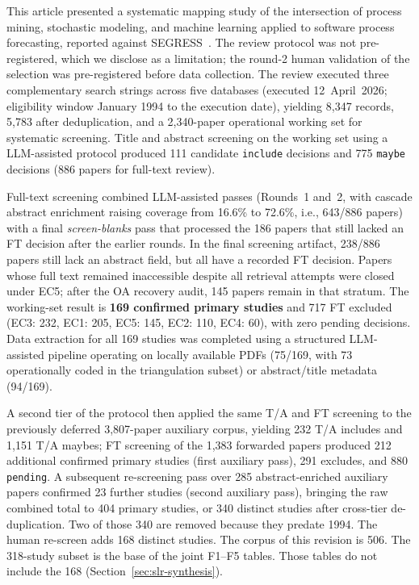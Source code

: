 This article presented a systematic mapping study of the intersection of
process mining, stochastic modeling, and machine learning applied to software
process forecasting, reported against SEGRESS~\cite{kitchenham2023segress}.
The review protocol was not pre-registered, which we disclose as a
limitation; the round-2 human validation of the selection was pre-registered
before data collection.
The review executed three complementary search strings across five databases
(executed 12~April~2026; eligibility window January 1994 to the execution
date), yielding 8{,}347
records, 5{,}783 after deduplication, and a 2{,}340-paper operational working
set for systematic screening. Title
and abstract screening on the working set using a LLM-assisted protocol
produced 111 candidate \texttt{include} decisions and 775 \texttt{maybe}
decisions (886 papers for full-text review).

Full-text screening combined LLM-assisted passes (Rounds~1 and~2, with cascade
abstract enrichment raising coverage from 16.6\% to 72.6\%, i.e., 643/886
papers) with a final \emph{screen-blanks} pass that processed the 186 papers
that still lacked an FT decision after the earlier rounds. In the final
screening artifact, 238/886 papers still lack an abstract field, but all have
a recorded FT decision. Papers whose full text remained inaccessible despite
all retrieval attempts were closed under EC5; after the OA recovery audit,
145 papers remain in that stratum. The working-set
result is \textbf{169 confirmed primary studies} and 717 FT excluded (EC3:
232, EC1: 205, EC5: 145, EC2: 110, EC4: 60), with zero pending decisions.
Data extraction for all 169 studies was completed using a structured
LLM-assisted pipeline operating on locally available PDFs (75/169, with 73
operationally coded in the triangulation subset) or abstract/title metadata
(94/169).

A second tier of the protocol then applied the same T/A and FT screening
to the previously deferred 3{,}807-paper auxiliary corpus, yielding 232
T/A includes and 1{,}151 T/A maybes; FT screening of the 1{,}383 forwarded
papers produced 212 additional confirmed primary studies (first auxiliary
pass), 291 excludes, and 880 \texttt{pending}. A subsequent re-screening
pass over 285 abstract-enriched auxiliary papers confirmed 23 further
studies (second auxiliary pass), bringing the raw combined total to
404 primary studies, or 340 distinct studies after cross-tier
de-duplication. Two of those 340 are removed because they predate 1994.
The human re-screen adds 168 distinct studies. The corpus of this revision
is 506. The 318-study subset is the base of the joint F1--F5 tables. Those
tables do not include the 168
(Section~\ref{sec:slr-synthesis}).

